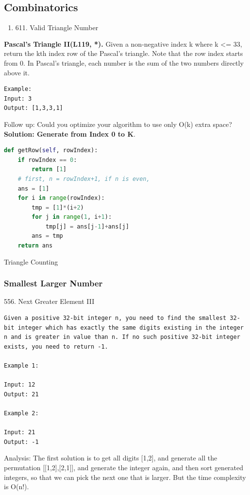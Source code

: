 \documentclass[../main.tex]{subfiles}
\begin{document}
\subsection{Combinatorics}
\begin{enumerate}
    \item 611. Valid Triangle Number
\end{enumerate}
\begin{examples}[resume]
\item \textbf{Pascal's Triangle II(L119, *).} Given a non-negative index k where k <= 33, return the kth index row of the Pascal's triangle. Note that the row index starts from 0. In Pascal's triangle, each number is the sum of the two numbers directly above it.
\begin{lstlisting}[numbers=none]
Example:
Input: 3
Output: [1,3,3,1]
\end{lstlisting}
Follow up: Could you optimize your algorithm to use only O(k) extra space?
\textbf{Solution: Generate from Index 0 to K}. 
\begin{lstlisting}[language=Python]
def getRow(self, rowIndex):
    if rowIndex == 0:
        return [1]
    # first, n = rowIndex+1, if n is even, 
    ans = [1]
    for i in range(rowIndex):
        tmp = [1]*(i+2)
        for j in range(1, i+1):
            tmp[j] = ans[j-1]+ans[j]
        ans = tmp
    return ans
\end{lstlisting}
Triangle Counting

\end{examples}
\subsubsection{Smallest Larger Number}
556. Next Greater Element III
\begin{lstlisting}
Given a positive 32-bit integer n, you need to find the smallest 32-bit integer which has exactly the same digits existing in the integer n and is greater in value than n. If no such positive 32-bit integer exists, you need to return -1.

Example 1:

Input: 12
Output: 21

Example 2:

Input: 21
Output: -1
\end{lstlisting}
Analysis: The first solution is to get all digits [1,2], and generate all the permutation [[1,2],[2,1]], and generate the integer again, and then sort generated integers, so that we can pick the next one that is larger. But the time complexity is O(n!).
\end{document}
